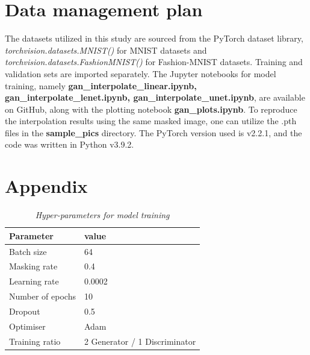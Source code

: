 \chapter{Data management plan}

The datasets utilized in this study are sourced from the PyTorch dataset library, \textit{torchvision.datasets.MNIST()} for MNIST datasets and \textit{torchvision.datasets.FashionMNIST()} for Fashion-MNIST datasets. Training and validation sets are imported separately. The Jupyter notebooks for model training, namely \textbf{gan\_interpolate\_linear.ipynb, gan\_interpolate\_lenet.ipynb, gan\_interpolate\_unet.ipynb}, are available on GitHub, along with the plotting notebook \textbf{gan\_plots.ipynb}. To reproduce the interpolation results using the same masked image, one can utilize the .pth files in the \textbf{sample\_pics} directory. The PyTorch version used is v2.2.1, and the code was written in Python v3.9.2.


\chapter{Appendix}
\begin{table}[H]
    \centering
    \begin{tabular}{ll}
    \hline
    \textbf{Parameter}            &  \textbf{value}       \\
    \hline
    Batch size & 64 \\
    Masking rate & 0.4 \\
    Learning rate & 0.0002 \\
    Number of epochs & 10 \\
    Dropout & 0.5 \\
    Optimiser & Adam \\
    Training ratio & 2 Generator / 1 Discriminator \\
    
    \hline
    \end{tabular}
    \caption{\textit{Hyper-parameters for model training}}
    \label{tab:param}
\end{table}



